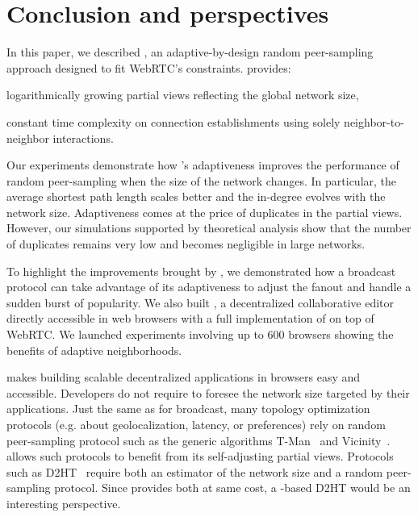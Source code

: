 
\section{Conclusion and perspectives}
\label{sec:conclusion}



In this paper, we described \SPRAY, an adaptive-by-design random peer-sampling
approach designed to fit WebRTC's constraints.  \SPRAY provides:
\begin{inparaenum}[(i)]
\item logarithmically growing partial views reflecting the global network size,
\item constant time complexity on connection establishments using solely
  neighbor-to-neighbor interactions.
\end{inparaenum}
Our experiments demonstrate how \SPRAY's adaptiveness improves the performance
of random peer-sampling when the size of the network changes. In particular, the
average shortest path length scales better and the in-degree evolves with the
network size.
Adaptiveness comes at the price of duplicates in the partial views. However, our
simulations supported by theoretical analysis show that the number of duplicates
remains very low and becomes negligible in large networks.

To highlight the improvements brought by \SPRAY, we demonstrated how a
broadcast protocol can take advantage of its adaptiveness to adjust
the fanout and handle a sudden burst of popularity. We also built
\CRATE, a decentralized collaborative editor directly accessible in
web browsers with a full implementation of \SPRAY on top of WebRTC. We
launched experiments involving up to 600 browsers showing the %
benefits of adaptive neighborhoods.

\SPRAY makes building scalable decentralized applications in browsers easy and
accessible.  Developers do not require to foresee the network size targeted by
their applications. Just the same as for broadcast, many topology optimization
protocols (e.g. about geolocalization, latency, or preferences) rely on random
peer-sampling protocol such as the generic algorithms
T-Man~\cite{jelasity2009tman} and Vicinity~\cite{voulgaris2005epidemic}. \SPRAY
allows such protocols to benefit from its self-adjusting partial
views. Protocols such as D2HT~\cite{bertier-d2ht} require both an estimator of
the network size and a random peer-sampling protocol. Since \SPRAY provides both
at same cost, a \SPRAY-based D2HT would be an interesting perspective.

